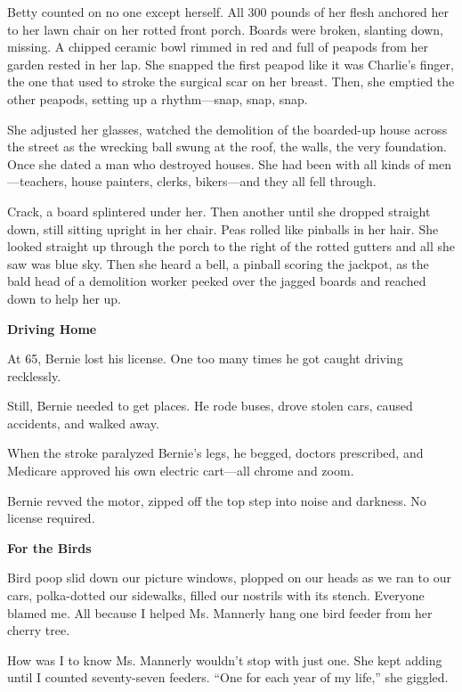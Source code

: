 \documentclass[
]{article}
\begin{document}
Betty counted on no one except herself. All 300 pounds of her flesh
anchored her to her lawn chair on her rotted front porch. Boards were
broken, slanting down, missing. A chipped ceramic bowl rimmed in red and
full of peapods from her garden rested in her lap. She snapped the first
peapod like it was Charlie's finger, the one that used to stroke the
surgical scar on her breast. Then, she emptied the other peapods,
setting up a rhythm---snap, snap, snap.

She adjusted her glasses, watched the demolition of the boarded-up house
across the street as the wrecking ball swung at the roof, the walls, the
very foundation. Once she dated a man who destroyed houses. She had been
with all kinds of men---teachers, house painters, clerks, bikers---and
they all fell through.

Crack, a board splintered under her. Then another until she dropped
straight down, still sitting upright in her chair. Peas rolled like
pinballs in her hair. She looked straight up through the porch to the
right of the rotted gutters and all she saw was blue sky. Then she heard
a bell, a pinball scoring the jackpot, as the bald head of a demolition
worker peeked over the jagged boards and reached down to help her
up.\textbf{\hfill\break
}

\textbf{Driving Home}

At 65, Bernie lost his license. One too many times he got caught driving
recklessly.

Still, Bernie needed to get places. He rode buses, drove stolen cars,
caused accidents, and walked away.

When the stroke paralyzed Bernie's legs, he begged, doctors prescribed,
and Medicare approved his own electric cart---all chrome and zoom.

Bernie revved the motor, zipped off the top step into noise and
darkness. No license required.

\textbf{\hfill\break
}

\textbf{For the Birds}

Bird poop slid down our picture windows, plopped on our heads as we ran
to our cars, polka-dotted our sidewalks, filled our nostrils with its
stench. Everyone blamed me. All because I helped Ms. Mannerly hang one
bird feeder from her cherry tree.

How was I to know Ms. Mannerly wouldn't stop with just one. She kept
adding until I counted seventy-seven feeders. ``One for each year of my
life,'' she giggled.
\end{document}
